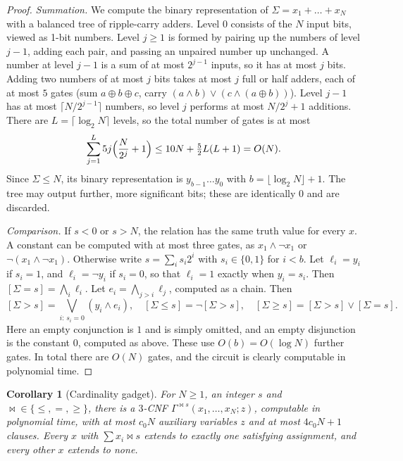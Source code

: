 \documentclass[11pt]{amsart}
\newtheorem{corollary}[theorem]{Corollary}
\theoremstyle{definition}
\theoremstyle{remark}
\begin{document}
\begin{proof}
\emph{Summation.} We compute the binary representation of $\Sigma=x_1+\dots+x_N$ with a balanced tree of ripple-carry adders. Level $0$ consists of the $N$ input bits, viewed as 1-bit numbers. Level $j\ge1$ is formed by pairing up the numbers of level $j-1$, adding each pair, and passing an unpaired number up unchanged. A number at level $j-1$ is a sum of at most $2^{j-1}$ inputs, so it has at most $j$ bits. Adding two numbers of at most $j$ bits takes at most $j$ full or half adders, each of at most $5$ gates (sum $a\oplus b\oplus c$, carry $(a\wedge b)\vee(c\wedge(a\oplus b))$). Level $j-1$ has at most $\lceil N/2^{j-1}\rceil$ numbers, so level $j$ performs at most $N/2^j+1$ additions. There are $L=\lceil\log_2N\rceil$ levels, so the total number of gates is at most
\[
\sum_{j=1}^{L}5j\Bigl(\frac{N}{2^j}+1\Bigr)\le 10N+\tfrac52L(L+1)=O(N).
\]
Since $\Sigma\le N$, its binary representation is $y_{b-1}\dots y_0$ with $b=\lfloor\log_2N\rfloor+1$. The tree may output further, more significant bits; these are identically $0$ and are discarded.

\emph{Comparison.} If $s<0$ or $s>N$, the relation has the same truth value for every $x$. A constant can be computed with at most three gates, as $x_1\wedge\neg x_1$ or $\neg(x_1\wedge\neg x_1)$. Otherwise write $s=\sum_i s_i2^i$ with $s_i\in\{0,1\}$ for $i<b$. Let $\ell_i=y_i$ if $s_i=1$, and $\ell_i=\neg y_i$ if $s_i=0$, so that $\ell_i=1$ exactly when $y_i=s_i$. Then $[\Sigma=s]=\bigwedge_i\ell_i$. Let $e_i=\bigwedge_{j>i}\ell_j$, computed as a chain. Then
\[
[\Sigma>s]=\bigvee_{i:\,s_i=0}(y_i\wedge e_i),\quad [\Sigma\le s]=\neg[\Sigma>s],\quad [\Sigma\ge s]=[\Sigma>s]\vee[\Sigma=s].
\]
Here an empty conjunction is $1$ and is simply omitted, and an empty disjunction is the constant $0$, computed as above. These use $O(b)=O(\log N)$ further gates. In total there are $O(N)$ gates, and the circuit is clearly computable in polynomial time.
\end{proof}

\begin{corollary}[Cardinality gadget]\label{cor:gadget}
For $N\ge1$, an integer $s$ and ${\bowtie}\in\{\le,=,\ge\}$, there is a $3$-CNF $\Gamma^{\bowtie s}(x_1,\dots,x_N;z)$, computable in polynomial time, with at most $c_0N$ auxiliary variables $z$ and at most $4c_0N+1$ clauses. Every $x$ with $\sum x_i\bowtie s$ extends to exactly one satisfying assignment, and every other $x$ extends to none.
\end{corollary}
\end{document}
